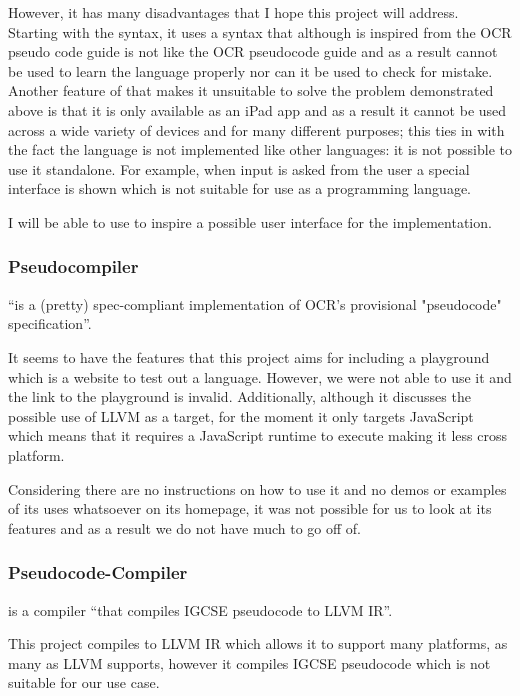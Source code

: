\documentclass{article}
\begin{document}
However, it has many disadvantages that I hope this project will address.
Starting with the syntax, it uses a syntax that although is inspired from the
OCR pseudo code guide is not like the OCR pseudocode guide and as a result
cannot be used to learn the language properly nor can it be used to check for
mistake. Another feature of \textcite{jacobsieradzki18} that makes it
unsuitable to solve the problem demonstrated above is that it is only available
as an iPad app and as a result it cannot be used across a wide variety of
devices and for many different purposes; this ties in with the fact the
language is not implemented like other languages: it is not possible to use it
standalone. For example, when input is asked from the user a special interface
is shown which is not suitable for use as a programming language.

I will be able to use \textcite{jacobsieradzki18} to inspire a possible user
interface for the implementation.

\subsubsection{Pseudocompiler}

\Textcite{pseudocompiler} ``is a (pretty) spec-compliant implementation of
OCR's provisional "pseudocode" specification''.

It seems to have the features that this project aims for including a playground
which is a website to test out a language. However, we were not able to use it
and the link to the playground is invalid. Additionally, although it discusses
the possible use of LLVM as a target, for the moment it only targets JavaScript
which means that it requires a JavaScript runtime to execute making it less
cross platform.

Considering there are no instructions on how to use it and no demos or examples
of its uses whatsoever on its homepage, it was not possible for us to look at
its features and as a result we do not have much to go off of.

\subsubsection{Pseudocode-Compiler}

\Textcite{pseudocode-compiler} is a compiler ``that compiles IGCSE pseudocode
to LLVM IR''.

This project compiles to LLVM IR which allows it to support many platforms, as
many as LLVM supports, however it compiles IGCSE pseudocode which is not
suitable for our use case.
\end{document}
